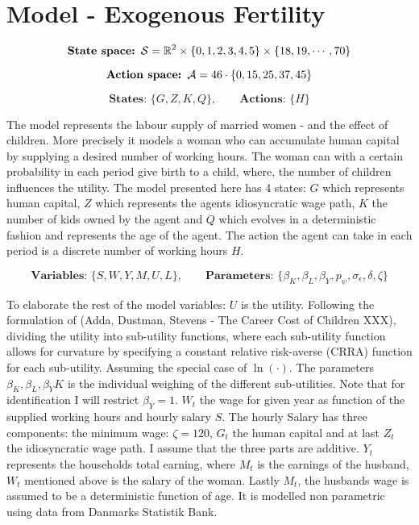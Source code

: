 \section{Model - Exogenous Fertility}\label{sec:model1}

\begin{equation}
    \textbf{State space: }\mathcal{S} = \mathbb{R}^{2} \times \{0, 1, 2, 3, 4, 5\} \times \{ 18, 19, \cdots, 70\}
\end{equation}

\begin{equation}
    \textbf{Action space: }\mathcal{A}  = 46 \cdot \{0, 15, 25, 37, 45\} 
\end{equation}

\begin{equation}
    \textbf{States: }\{G, Z, K, Q\}, \qquad \textbf{Actions: } \{H\} 
\end{equation}

The model represents the labour supply of married women - and the effect of children. More precisely it models a woman who can accumulate human capital by supplying a desired number of working hours. The woman can with a certain probability in each period give birth to a child, where, the number of children influences the utility. The model presented here has 4 states: $G$ which represents human capital, $Z$ which represents the agents idiosyncratic wage path, $K$ the number of kids owned by the agent and $Q$ which evolves in a deterministic fashion and represents the age of the agent. The action the agent can take in each period is a discrete number of working hours $H$.

\begin{equation}
    \textbf{Variables: }\{S, W, Y, M, U, L\},  \qquad \textbf{Parameters: } \{\beta_K, \beta_L, \beta_Y, p_\psi, \sigma_\epsilon, \delta, \zeta\}
\end{equation}


To elaborate the rest of the model variables: $U$ is the utility. Following the formulation of (Adda, Dustman, Stevens - The Career Cost of Children XXX), dividing the utility into sub-utility functions, where each sub-utility function allows for curvature by specifying a constant relative risk-averse (CRRA) function for each sub-utility. Assuming the special case of $\ln(\cdot)$. The parameters $\beta_K, \beta_L, \beta_YK$ is the individual weighing of the different sub-utilities. Note that for identification I will restrict $\beta_Y= 1$. $W_t$ the wage for given year as function of the supplied working hours and hourly salary $S$. The hourly Salary has three components: the minimum wage: $\zeta=120$, $G_t$ the human capital and at last $Z_t$ the idiosyncratic wage path. I assume that the three parts are additive. $Y_t$ represents the households total earning, where $M_t$ is the earnings of the husband, $W_t$ mentioned above is the salary of the woman. Lastly $M_t$, the husbands wage is assumed to be a deterministic function of age. It is modelled non parametric using data from Danmarks Statistik Bank.

